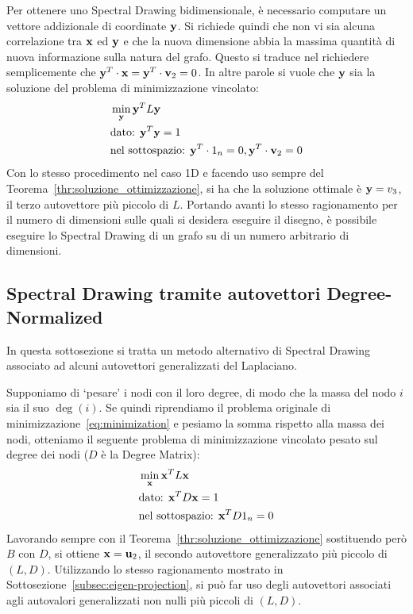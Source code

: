 \documentclass[10pt,a4paper]{article}
\begin{document}
Per ottenere uno Spectral Drawing bidimensionale, è necessario computare un vettore addizionale di coordinate \(\vb{y}\).
Si richiede quindi che non vi sia alcuna correlazione tra \(\vb{x}\) ed \(\vb{y}\) e che la nuova dimensione abbia la massima quantità di nuova informazione sulla natura del grafo.
Questo si traduce nel richiedere semplicemente che \(\vb{y}^T \cdot \vb{x} = \vb{y}^T \cdot \vb{v}_2 = 0\). In altre parole si vuole che \(\vb{y}\) sia la soluzione del problema di minimizzazione vincolato:
\begin{align}
    & \min_{\vb{y}} \vb{y}^T L\vb{y}\\
    & \text{dato: } \vb{y}^T\vb{y} = 1 \\
    & \text{nel sottospazio: } \vb{y}^T \cdot 1_n = 0, \vb{y}^T \cdot \vb{v}_2 = 0
\end{align}
Con lo stesso procedimento nel caso 1D e facendo uso sempre del Teorema~\ref{thr:soluzione_ottimizzazione}, si ha che la soluzione ottimale è \(\vb{y}=v_3\), il terzo autovettore più piccolo di \(L\).
Portando avanti lo stesso ragionamento per il numero di dimensioni sulle quali si desidera eseguire il disegno, è possibile eseguire lo Spectral Drawing di un grafo su di un numero arbitrario di dimensioni.

\subsection{Spectral Drawing tramite autovettori Degree-Normalized}\label{subsec:alt_spectral}

In questa sottosezione si tratta un metodo alternativo di Spectral Drawing associato ad alcuni autovettori generalizzati del Laplaciano.

Supponiamo di `pesare' i nodi con il loro degree, di modo che la massa del nodo \(i\) sia il suo \(\deg(i)\).
Se quindi riprendiamo il problema originale di minimizzazione~\eqref{eq:minimization} e pesiamo la somma rispetto alla massa dei nodi, otteniamo il seguente problema di minimizzazione vincolato pesato sul degree dei nodi (\(D\) è la Degree Matrix):
\begin{align}
    & \min_{\vb{x}} \vb{x}^T L \vb{x} \label{eq:with_degree}\\
    & \text{dato: } \vb{x}^T D \vb{x} = 1\\
    & \text{nel sottospazio: } \vb{x}^T D 1_n = 0\\
\end{align}
Lavorando sempre con il Teorema~\ref{thr:soluzione_ottimizzazione} sostituendo però \(B\) con \(D\), si ottiene \(\vb{x} = \vb{u}_2\), il secondo autovettore generalizzato più piccolo di \((L, D)\).
Utilizzando lo stesso ragionamento mostrato in Sottosezione~\ref{subsec:eigen-projection}, si può far uso degli autovettori associati agli autovalori generalizzati non nulli più piccoli di \((L, D)\).
\end{document}
